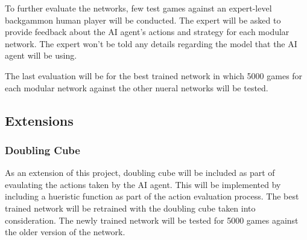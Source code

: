 \documentclass[12pt,a4paper]{article}
\begin{document}
To further evaluate the networks, few test games against an expert-level backgammon human player will be conducted. The expert will be asked to provide feedback about the AI agent's actions and strategy for each modular network. The expert won't be told any details regarding the model that the AI agent will be using. 

The last evaluation will be for the best trained network in which 5000 games for each modular network against the other nueral networks will be tested. 

\subsection{Extensions}
\subsubsection{Doubling Cube}
As an extension of this project, doubling cube will be included as part of evaulating the actions taken by the AI agent. This will be implemented by including a hueristic function as part of the action evaluation process. The best trained network will be retrained with the doubling cube taken into consideration. The newly trained network will be tested for 5000 games against the older version of the network. 


\end{document}
